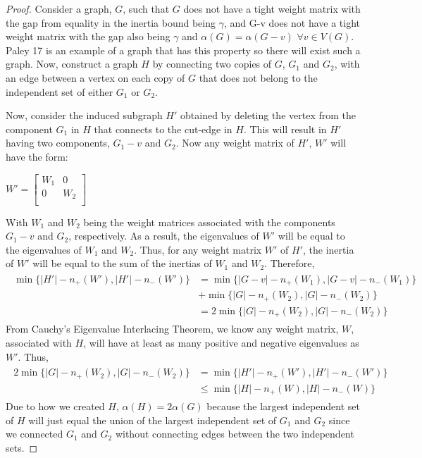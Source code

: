\documentclass[12pt]{article}
\theoremstyle{parenbold}
\begin{document}
\begin{proof}
Consider a graph, $G$, such that $G$ does not have a tight weight matrix with the gap from equality in the inertia bound being $\gamma$, and G-v does not have a tight weight matrix with the gap also being $\gamma$ and $\alpha(G) = \alpha(G-v)$ $\forall v \in V(G)$. Paley 17 is an example of a graph that has this property so there will exist such a graph. Now, construct a graph $H$ by connecting two copies of $G$, $G_1$ and $G_2$, with an edge between a vertex on each copy of $G$ that does not belong to the independent set of either $G_1$ or $G_2$.

Now, consider the induced subgraph $H'$ obtained by deleting the vertex from the component $G_1$ in $H$ that connects to the cut-edge in $H$. This will result in $H'$ having two components, $G_1-v$ and $G_2$. Now any weight matrix of $H'$, $W'$ will have the form:

\begin{center}
$W'=
\begin{bmatrix}
W_1 & 0 \\
0 & W_2 \\
\end{bmatrix}
$
\end{center}

With $W_1$ and $W_2$ being the weight matrices associated with the components $G_1-v$ and $G_2$, respectively. As a result, the eigenvalues of $W'$ will be equal to the eigenvalues of $W_1$ and $W_2$. Thus, for any weight matrix $W'$ of $H'$, the inertia of $W'$ will be equal to the sum of the inertias of $W_1$ and $W_2$. Therefore,
\begin{multline}
\begin{split}
\min\{|H'|-n_+(W'), |H'|-n_-(W')\} & = \min\{|G-v|-n_+(W_1), |G-v|-n_-(W_1)\} \\ & + \min\{|G|-n_+(W_2), |G|-n_-(W_2)\} \\ & = 2\min\{|G|-n_+(W_2), |G|-n_-(W_2)\}
\end{split}
\end{multline}
From Cauchy's Eigenvalue Interlacing Theorem, we know any weight matrix, $W$, associated with $H$, will have at least as many positive and negative eigenvalues as $W'$. Thus,
\begin{multline}
\begin{split}
2\min\{|G|-n_+(W_2), |G|-n_-(W_2)\} & = \min\{|H'|-n_+(W'), |H'|-n_-(W')\} \\ & \leq \min\{|H|-n_+(W), |H|-n_-(W)\}
\end{split}
\end{multline}
Due to how we created $H$, $\alpha(H) = 2\alpha(G)$ because the largest independent set of $H$ will just equal the union of the largest independent set of $G_1$ and $G_2$ since we connected $G_1$ and $G_2$ without connecting edges between the two independent sets.


\end{proof}
\end{document}
